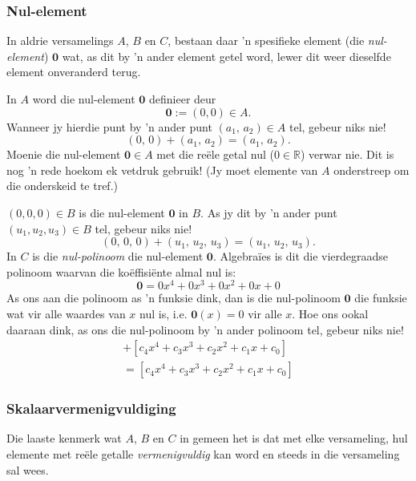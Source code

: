 \documentclass[a4paper,11pt]{book}
\theoremstyle{definition}
\newcommand{\be}{\begin{equation}}
\newcommand{\ee}{\end{equation}}
\newcommand{\ve}[1]{\mathbf{#1}}
\begin{document}
\subsubsection{Nul-element}
In aldrie versamelings $A$, $B$ en $C$, bestaan daar 'n spesifieke element
(die \emph{nul-element}) $\ve{0}$ wat, as dit by 'n ander element getel
word, lewer dit weer dieselfde element onveranderd terug.

In $A$ word die nul-element $\ve{0}$ definieer deur
\be \label{zero_in_A}
\ve{0} := (0,0) \in A.
\ee
Wanneer jy hierdie punt by 'n ander punt $(a_1, \, a_2) \in A$ tel, gebeur
niks nie!
\[
(0, \,0) + (a_1, \, a_2) = (a_1, \, a_2).
\]
Moenie die nul-element  $\ve{0} \in A$ met die re{\"e}le getal nul ($0 \in
\mathbb{R}$) verwar nie. Dit is nog 'n rede hoekom ek vetdruk gebruik! (Jy
moet elemente van $A$ onderstreep om die onderskeid te tref.)

$(0,0,0) \in B$ is die nul-element $\ve{0}$ in $B$. As jy dit by 'n ander
punt $(u_1, u_2, u_3) \in B$ tel, gebeur niks nie!
\[
	(0, \, 0, \, 0) + (u_1, \, u_2, \, u_3) = (u_1, \, u_2, \, u_3).
\]
In $C$ is die \emph{nul-polinoom} die nul-element $\ve{0}$. Algebra{\"i}es
is dit die vierdegraadse polinoom waarvan die ko{\"e}ffisi{\"e}nte almal
nul is:
\be \label{zero_in_C}
\ve{0} = 0 x^4 + 0 x^3 + 0 x^2 + 0 x + 0
\ee
As ons aan die polinoom as 'n funksie dink, dan is die nul-polinoom
$\ve{0}$ die funksie wat vir alle waardes van $x$ nul is, i.e. $\ve{0} (x)
= 0$ vir alle $x$. Hoe ons ookal daaraan dink, as ons die nul-polinoom by
'n ander polinoom tel, gebeur niks nie!
\begin{multline*}
	[0 x^4 + 0 x^3 + 0 x^2 + 0 x + 0 ] + [c_4 x^4 + c_3 x^3 + c_2 x^2 + c_1
	x + c_0] \\
	= [c_4 x^4 + c_3 x^3 + c_2 x^2 + c_1 x + c_0]
\end{multline*}

\subsubsection{Skalaarvermenigvuldiging}
Die laaste kenmerk wat $A$, $B$ en $C$ in gemeen het is dat met elke
versameling, hul elemente met re{\"e}le getalle \emph{vermenigvuldig} kan
word en steeds in die versameling sal wees.
\end{document}

